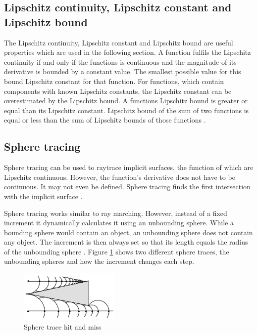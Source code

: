 \subsection{Lipschitz continuity, Lipschitz constant and Lipschitz bound}
The Lipschitz continuity, Lipschitz constant and Lipschitz bound are useful properties which are used in the following section. A function fulfils the Lipschitz continuity if and only if the functions is continuous and the magnitude of its derivative is bounded by a constant value. The smallest possible value for this bound Lipschitz constant for that function. For functions, which contain components with known Lipschitz constants, the Lipschitz constant can be overestimated by the Lipschitz bound. A functions Lipschitz bound is greater or equal than its Lipschitz constant. Lipschitz bound of the sum of two functions is equal or less than the sum of Lipschitz bounds of those functions 
\cite{hart:1996:sphere, Heuser:2003}.

\subsection{Sphere tracing}

Sphere tracing can be used to raytrace implicit surfaces, the function of which are Lipschitz continuous. However, the function's derivative does not have to be continuous. It may not even be defined. Sphere tracing finds the first intersection with the implicit surface \cite{hart:1996:sphere}.

Sphere tracing works similar to ray marching. However, instead of a fixed increment it dynamically calculates it using an unbounding sphere. While a bounding sphere would contain an object, an unbounding sphere does not contain any object. The increment is then always set so that its length equals the radius of the unbounding sphere \cite{hart:1996:sphere}. 
Figure \ref{fig:sphere-trace} shows two different sphere traces, the unbounding spheres and how the increment changes each step.

\begin{figure}[!h]
	\begin{center}
	\includegraphics[height=2.5cm]{sphere-trace-hit-and-miss.png}
	\caption{Sphere trace hit and miss \cite{hart:1996:sphere}}
	\label{fig:sphere-trace}
	\end{center}
\end{figure}

